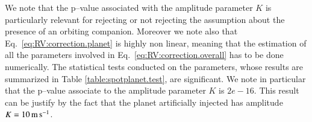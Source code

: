 \documentclass[11pt, oneside]{article}
\def\ms{\hbox{\,m\,s$^{-1}$}}         %
\begin{document}
We note that the p--value associated with the amplitude parameter $K$ is particularly relevant for rejecting or not rejecting the assumption about the presence of an orbiting companion. Moreover we note also that Eq.~\ref{eq:RV:correction.planet} is highly non linear, meaning that the estimation of all the parameters involved in Eq.~\ref{eq:RV:correction.overall} has to be done numerically. %
The statistical tests conducted on the parameters, whose results are summarized in Table \ref{table:spotplanet.test}, are significant. We note in particular that the p--value associate to the amplitude parameter $K$ is $2e-16$. This result can be justify by the fact that the planet artificially injected has amplitude $K=10 \ms$.

\end{document}
